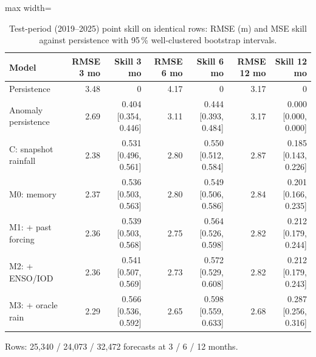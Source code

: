 \begin{table}[t]
\caption{Test-period (2019--2025) point skill on identical rows: RMSE (m) and MSE skill against persistence with 95\,\% well-clustered bootstrap intervals.}
\label{tab:skill}
\centering\small
\begin{adjustbox}{max width=\textwidth}
\begin{tabular}{lrrrrrr}
\toprule
Model & RMSE 3 mo & Skill 3 mo & RMSE 6 mo & Skill 6 mo & RMSE 12 mo & Skill 12 mo \\
\midrule
Persistence & 3.48 & 0 & 4.17 & 0 & 3.17 & 0 \\
Anomaly persistence & 2.69 & 0.404 [0.354, 0.446] & 3.11 & 0.444 [0.393, 0.484] & 3.17 & 0.000 [0.000, 0.000] \\
C: snapshot rainfall & 2.38 & 0.531 [0.496, 0.561] & 2.80 & 0.550 [0.512, 0.584] & 2.87 & 0.185 [0.143, 0.226] \\
M0: memory & 2.37 & 0.536 [0.503, 0.563] & 2.80 & 0.549 [0.506, 0.586] & 2.84 & 0.201 [0.166, 0.235] \\
M1: + past forcing & 2.36 & 0.539 [0.503, 0.568] & 2.75 & 0.564 [0.526, 0.598] & 2.82 & 0.212 [0.179, 0.244] \\
M2: + ENSO/IOD & 2.36 & 0.541 [0.507, 0.569] & 2.73 & 0.572 [0.529, 0.608] & 2.82 & 0.212 [0.179, 0.243] \\
M3: + oracle rain & 2.29 & 0.566 [0.536, 0.592] & 2.65 & 0.598 [0.559, 0.633] & 2.68 & 0.287 [0.256, 0.316] \\
\bottomrule
\end{tabular}
\end{adjustbox}
\par\smallskip\begin{minipage}{0.95\textwidth}\footnotesize Rows: 25,340 / 24,073 / 32,472 forecasts at 3 / 6 / 12 months.\end{minipage}
\end{table}
